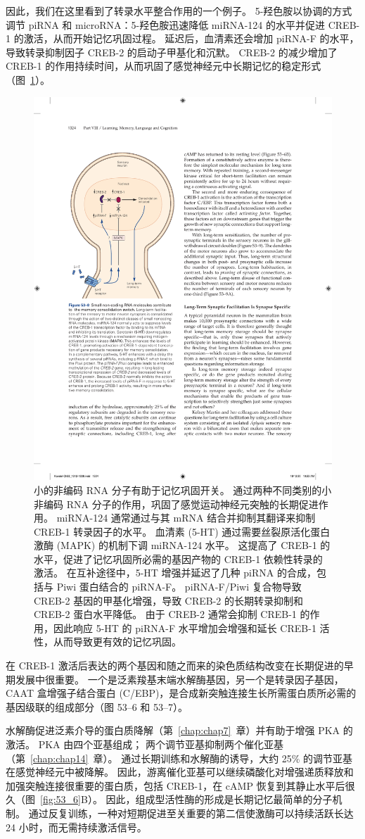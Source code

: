 因此，我们在这里看到了转录水平整合作用的一个例子。 5-羟色胺以协调的方式调节 piRNA 和 microRNA：5-羟色胺迅速降低 miRNA-124 的水平并促进 CREB-1 的激活，从而开始记忆巩固过程。
延迟后，血清素还会增加 piRNA-F 的水平，导致转录抑制因子 CREB-2 的启动子甲基化和沉默。
CREB-2 的减少增加了 CREB-1 的作用持续时间，从而巩固了感觉神经元中长期记忆的稳定形式（图~\ref{fig:53_8}）。


\begin{figure}[htbp]
	\centering
	\includegraphics[width=0.5\linewidth]{chap53/fig_53_8}
	\caption{小的非编码 RNA 分子有助于记忆巩固开关。 通过两种不同类别的小非编码 RNA 分子的作用，巩固了感觉运动神经元突触的长期促进作用。 miRNA-124 通常通过与其 mRNA 结合并抑制其翻译来抑制 CREB-1 转录因子的水平。 血清素 (5-HT) 通过需要丝裂原活化蛋白激酶 (MAPK) 的机制下调 miRNA-124 水平。 这提高了 CREB-1 的水平，促进了记忆巩固所必需的基因产物的 CREB-1 依赖性转录的激活。 在互补途径中，5-HT 增强并延迟了几种 piRNA 的合成，包括与 Piwi 蛋白结合的 piRNA-F。 piRNA-F/Piwi 复合物导致 CREB-2 基因的甲基化增强，导致 CREB-2 的长期转录抑制和 CREB-2 蛋白水平降低。 由于 CREB-2 通常会抑制 CREB-1 的作用，因此响应 5-HT 的 piRNA-F 水平增加会增强和延长 CREB-1 活性，从而导致更有效的记忆巩固。}
	\label{fig:53_8}
\end{figure}


在 CREB-1 激活后表达的两个基因和随之而来的染色质结构改变在长期促进的早期发展中很重要。
一个是泛素羧基末端水解酶基因，另一个是转录因子基因，CAAT 盒增强子结合蛋白 (C/EBP)，是合成新突触连接生长所需蛋白质所必需的基因级联的组成部分（图 53–6 和 53–7）。


水解酶促进泛素介导的蛋白质降解（第~\ref{chap:chap7}~章）并有助于增强 PKA 的激活。
PKA 由四个亚基组成； 两个调节亚基抑制两个催化亚基（第~\ref{chap:chap14}~章）。
通过长期训练和水解酶的诱导，大约 25\% 的调节亚基在感觉神经元中被降解。
因此，游离催化亚基可以继续磷酸化对增强递质释放和加强突触连接很重要的蛋白质，包括 CREB-1，在 cAMP 恢复到其静止水平后很久（图~\ref{fig:53_6}B）。
因此，组成型活性酶的形成是长期记忆最简单的分子机制。
通过反复训练，一种对短期促进至关重要的第二信使激酶可以持续活跃长达 24 小时，而无需持续激活信号。


